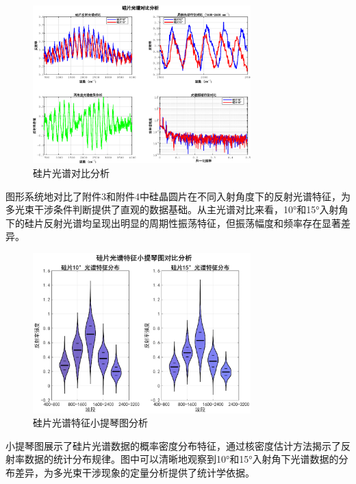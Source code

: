 \documentclass[withoutpreface,bwprint]{cumcmthesis}
\begin{document}
\begin{figure}[H]
\centering
\includegraphics[width=0.75\textwidth]{figures/silicon_spectrum_comparison.eps}
\caption{硅片光谱对比分析}
\label{fig:硅片光谱对比分析}
\end{figure}

图形系统地对比了附件3和附件4中硅晶圆片在不同入射角度下的反射光谱特征，为多光束干涉条件判断提供了直观的数据基础。从主光谱对比来看，10°和15°入射角下的硅片反射光谱均呈现出明显的周期性振荡特征，但振荡幅度和频率存在显著差异。

\begin{figure}[H]
\centering
\includegraphics[width=0.75\textwidth]{figures/silicon_spectrum_violin.eps}
\caption{硅片光谱特征小提琴图分析}
\label{fig:硅片光谱小提琴图}
\end{figure}

小提琴图展示了硅片光谱数据的概率密度分布特征，通过核密度估计方法揭示了反射率数据的统计分布规律。图中可以清晰地观察到10°和15°入射角下光谱数据的分布差异，为多光束干涉现象的定量分析提供了统计学依据。
\end{document}
